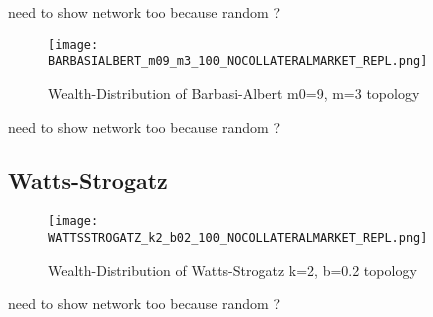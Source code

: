 \documentclass[Bachelorarbeit.tex]{subfiles}
\begin{document}
need to show network too because random ?

\begin{figure}[H]
	\centering
  \texttt{[image: BARBASIALBERT\_m09\_m3\_100\_NOCOLLATERALMARKET\_REPL.png]}
	\caption{Wealth-Distribution of Barbasi-Albert m0=9, m=3 topology}
	\label{fig:wealth_BARBASIALBERT_m09_m3_100_NOCOLLATERALMARKET_REPL}
\end{figure}

need to show network too because random ?

\subsection{Watts-Strogatz}
\begin{figure}[H]
	\centering
  \texttt{[image: WATTSSTROGATZ\_k2\_b02\_100\_NOCOLLATERALMARKET\_REPL.png]}
	\caption{Wealth-Distribution of Watts-Strogatz k=2, b=0.2 topology}
	\label{fig:wealth_WATTSSTROGATZ_k2_b02_100_NOCOLLATERALMARKET_REPL}
\end{figure}

need to show network too because random ?
\end{document}
